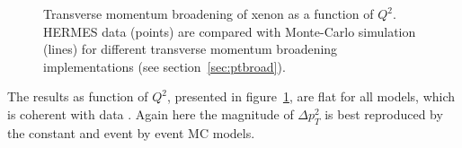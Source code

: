 \begin{figure}[tbp]
  \centering
{}
\caption {Transverse momentum broadening of xenon as a function of $Q^2$. 
HERMES data \cite{Airapetian:2009jy} (points) are compared with Monte-Carlo 
simulation (lines) for different transverse momentum broadening implementations 
(see section~\ref{sec:ptbroad}).}
\label{fig:PtC-PtQ2}
\end{figure}

The results as function of $Q^2$, presented in figure~\ref{fig:PtC-PtQ2}, are flat for all models, which is coherent with data \cite{Airapetian:2009jy}. Again here the magnitude of $\Delta p_T^2$ is best reproduced by the constant and event by event MC models.

